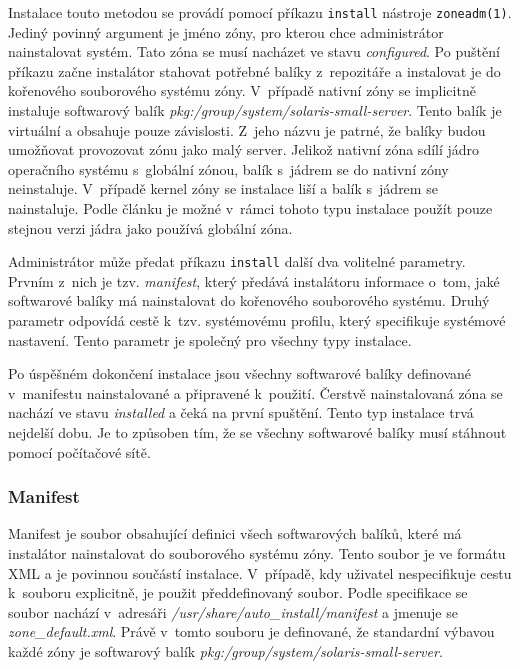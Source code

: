 Instalace touto metodou se provádí pomocí příkazu \verb|install| nástroje \verb|zoneadm(1)|. Jediný povinný argument je jméno
zóny, pro kterou chce administrátor nainstalovat systém. Tato zóna se musí nacházet ve stavu \textit{configured}. Po puštění 
příkazu začne instalátor stahovat potřebné balíky z~repozitáře a instalovat je do kořenového souborového systému zóny. V~případě
nativní zóny se implicitně instaluje softwarový balík \textit{pkg:/group/system/solaris-small-server}. Tento balík je virtuální
a obsahuje pouze závislosti. Z~jeho názvu je patrné, že balíky budou umožňovat provozovat zónu jako malý server. Jelikož nativní
zóna sdílí jádro operačního systému s~globální zónou, balík s~jádrem se do nativní zóny neinstaluje. V~případě kernel zóny
se instalace liší a balík s~jádrem se nainstaluje. Podle článku \cite{oracle:solaris:zones:kernel_version} je možné
v~rámci tohoto typu instalace použít pouze stejnou verzi jádra jako používá globální zóna.

Administrátor může předat příkazu \verb|install| další dva volitelné parametry. Prvním z~nich je tzv. \textit{manifest}, který
předává instalátoru informace o~tom, jaké softwarové balíky má nainstalovat do kořenového souborového systému. Druhý parametr
odpovídá cestě k~tzv. systémovému profilu, který specifikuje systémové nastavení. Tento parametr je společný pro všechny typy
instalace.

Po úspěšném dokončení instalace jsou všechny softwarové balíky definované v~manifestu nainstalované a připravené k~použití.
Čerstvě nainstalovaná zóna se nachází ve stavu \textit{installed} a čeká na první spuštění. Tento typ instalace trvá nejdelší
dobu. Je to způsoben tím, že se všechny softwarové balíky musí stáhnout pomocí počítačové sítě.
\subsubsection{Manifest}
\label{chapter:zones:instalation:repozitory:manifest}
Manifest je soubor obsahující definici všech softwarových balíků, které má instalátor nainstalovat do souborového systému zóny. Tento
soubor je ve formátu XML a je povinnou součástí instalace.  V~případě, kdy uživatel nespecifikuje cestu k~souboru explicitně, je použit
předdefinovaný soubor. Podle specifikace \cite{oracle:solaris:zones:manifest} se soubor nachází v~adresáři \textit{/usr/share/auto\_install/manifest}
a jmenuje se \textit{zone\_default.xml}. Právě v~tomto souboru je definované, že standardní výbavou každé zóny je softwarový
balík \textit{pkg:/group/system/solaris-small-server}.

